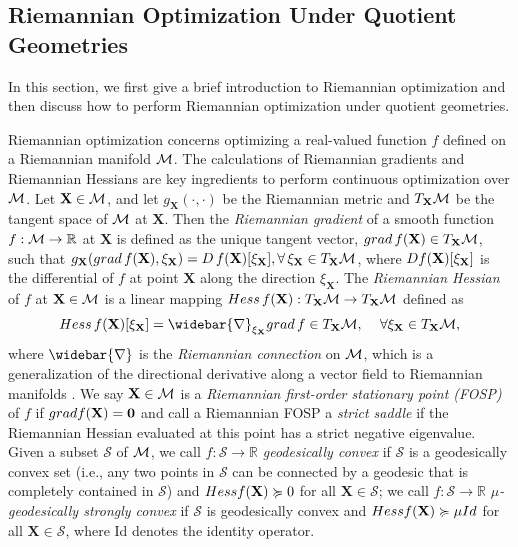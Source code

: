 \documentclass[11pt]{article}
\newcommand{\bbR}{\mathbb{R}}
\newcommand{\cS}{\mathcal{S}}
\newcommand{\0}{{\mathbf{0}}}
\newcommand{\1}{{\mathbf{1}}}
\newcommand{\X}{{\mathbf{X}}}
\newcommand{\cM}{{\cal M}}
\newcommand{\Hess}{{\rm Hess}}
\newcommand{\grad}{{\rm grad}}
\newcommand{\nc}{\normalcolor}
\begin{document}
\subsection{Riemannian Optimization Under Quotient Geometries} \label{sec: Riemannian-opt-background}
In this section, we first give a brief introduction to Riemannian optimization and then discuss how to perform Riemannian optimization under quotient geometries. 

Riemannian optimization concerns optimizing a real-valued function $f$ defined on a Riemannian manifold $\cM$. The calculations of Riemannian gradients and Riemannian Hessians are key ingredients to perform continuous optimization over $\cM$. Let $\X \in \cM$, and let $g_{\X}( \cdot, \cdot )$ be the Riemannian metric and $T_\X \cM$ be the tangent space of $\cM$ at $\X$. Then the {\it Riemannian gradient} of a smooth function $f:\cM \to \bbR$ at $\X$ is defined as the unique tangent vector, ${\rm grad}\, f(\X) \in T_\X \cM$, such that $g_\X( \grad \, f(\X),\xi_\X ) = {\rm D} \, f(\X)[\xi_\X], \forall\, \xi_\X \in T_\X \cM$, where ${\rm D} f(\X)[\xi_\X]$ is the differential of $f$ at point $\X$ along the direction $\xi_\X$. The {\it Riemannian Hessian} of $f$ at $\X\in\cM$ is a linear mapping ${\rm Hess} \,f(\X): T_\X\cM \to T_\X\cM$ defined as
\begin{equation} \label{def: Riemannain-Hessian}
	{\rm Hess}\, f(\X)[\xi_\X] = \widebar{\nabla}_{\xi_\X} {\rm grad}\, f \in T_\X \cM, \,\quad \forall \xi_\X \in T_\X \cM,
\end{equation}
where $\widebar{\nabla}$ is the {\it Riemannian connection} on $\cM$, which is a generalization of the directional derivative along a vector field to Riemannian manifolds \cite[Section 5.3]{absil2009optimization}. We say $\X \in \cM$ is a {\it Riemannian first-order stationary point (FOSP)} of $f$ if $\grad f(\X) = \0$ and call a Riemannian FOSP a {\it strict saddle} if the Riemannian Hessian evaluated at this point has a strict negative eigenvalue. Given a subset $\cS$ of $\cM$, we call $f: \cS \to \bbR$ {\it geodesically convex} if $\cS$ is a geodesically convex set (i.e., any two points in $\cS$ can be connected by a geodesic that is completely contained in $\cS$) \nc and $\Hess f(\X) \succcurlyeq 0$ for all $\X \in \cS$; we call $f: \cS \to \bbR$ {\it $\mu$-geodesically strongly convex} if $\cS$ is geodesically convex  and $\Hess f(\X) \succcurlyeq \mu {\rm Id}$ for all $\X \in \cS$, {where {\rm Id} denotes the identity operator}. 
\end{document}
